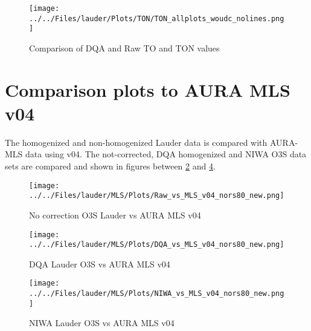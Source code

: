                                                 \begin{figure}
        \centering
\texttt{[image: ../../Files/lauder/Plots/TON/TON\_allplots\_woudc\_nolines.png]}
    \caption{Comparison of DQA and Raw TO and TON values}
            \label{fig:ton2}
    \end{figure}

%
\section{Comparison plots to AURA MLS v04}

    The homogenized and non-homogenized Lauder data is compared with AURA-MLS data using v04. The not-corrected,
    DQA homogenized and NIWA O3S data sets are compared and shown in figures between
\ref{fig:rawv04} and \ref{fig:niwav04}.

                                \begin{figure}
        \centering
\texttt{[image: ../../Files/lauder/MLS/Plots/Raw\_vs\_MLS\_v04\_nors80\_new.png]}
    \caption{No correction O3S Lauder vs AURA MLS v04 }
            \label{fig:rawv04}
    \end{figure}

                            \begin{figure}
        \centering
\texttt{[image: ../../Files/lauder/MLS/Plots/DQA\_vs\_MLS\_v04\_nors80\_new.png]}
    \caption{DQA Lauder O3S vs AURA MLS v04 }
            \label{fig:dqav04}
    \end{figure}

                                \begin{figure}
        \centering
\texttt{[image: ../../Files/lauder/MLS/Plots/NIWA\_vs\_MLS\_v04\_nors80\_new.png]}
    \caption{ NIWA Lauder O3S vs AURA MLS v04  }
            \label{fig:niwav04}
    \end{figure}

